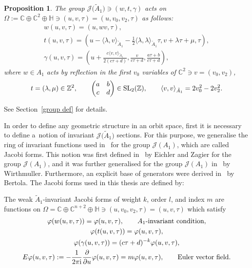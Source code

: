 \documentclass[pdftex]{sigma}%
\numberwithin{equation}{section}
\newtheorem{Proposition}[Theorem]{Proposition}
 { \theoremstyle{definition}
\newtheorem{Definition}[Theorem]{Definition}
\newtheorem{Remark}[Theorem]{Remark} }
\newcommand{\Ja}{\mathcal{J}}
\begin{document}
 \begin{Proposition}
The group $\Ja\big(\tilde A_1\big)\ni (w,t,\gamma)$ acts on $\Omega:=\mathbb{C}\oplus \mathbb{C}^{2}\oplus \mathbb{H} \ni (u,v,\tau)=(u,v_0,v_2,\tau)$ as follows:
\begin{gather*}
w(u,v,\tau)=(u,wv,\tau),
\\
t(u,v,\tau)=\left(u- \langle \lambda,v \rangle_{\tilde A_1}-\frac{1}{2} \langle \lambda,\lambda \rangle_{\tilde A_1}\tau,v+\lambda\tau+\mu,\tau\right),
\\
\gamma(u,v,\tau)=\left(u+\frac{c \langle v,v \rangle_{\tilde A_1}}{2(c\tau+d)},\frac{v}{c\tau+d},\frac{a\tau+b}{c\tau+d}\right),
\end{gather*}
where $w \in A_1$ acts by reflection in the first $v_0$ variables of $ \mathbb{C}^{2} \ni v=(v_0,v_2)$,
\[
t=(\lambda,\mu) \in \mathbb{Z}^{2}, \qquad
\begin{pmatrix} a & b\\c & d\end{pmatrix} \in {\rm SL}_2(\mathbb{Z}),\qquad
\langle v,v \rangle_{\tilde A_1}=2v_0^2-2v_2^2.
\]
\end{Proposition}
See Section~\ref{group def} for details.

In order to define any geometric structure in an orbit space, first it is necessary to define a~notion of invariant $\Ja\big(\tilde A_1\big)$ sections. For this purpose, we generalise the ring of invariant functions used in~\cite{BertolaM.1, BertolaM.2} for the group $\Ja( A_1)$, which are called Jacobi forms. This notion was first defined in~\cite{M.EichlerandD.Zagier} by Eichler and Zagier for the group $\Ja(A_1)$, and it was further generalised for the group $\Ja( A_1)$ in~\cite{K.Wirthmuller} by Wirthmuller. Furthermore, an explicit base of generators were derived in~\cite{BertolaM.1, BertolaM.2} by Bertola. The Jacobi forms used in this thesis are defined by:

\begin{Definition}
The weak $\tilde A_1$-invariant Jacobi forms of weight $k$, order $l$, and index $m$ are functions on $\Omega=\mathbb{C}\oplus \mathbb{C}^{n+2}\oplus\mathbb{H}\ni (u,v_0,v_2,\tau)=(u,v,\tau)$ which satisfy
\begin{gather}
\varphi(w(u,v,\tau))=\varphi(u,v,\tau),\qquad \textrm{$A_1$-invariant condition},\nonumber
\\
\varphi(t(u,v,\tau))=\varphi(u,v,\tau),\nonumber
\\
\varphi(\gamma(u,v,\tau))=(c\tau+d)^{-k}\varphi(u,v,\tau),\nonumber
\\
E\varphi(u,v,\tau):=-\frac{1}{2\pi {\rm i}}\frac{\partial}{\partial u}\varphi(u,v,\tau)=m\varphi(u,v,\tau),\qquad \textrm{Euler vector field}.
\label{jacobiform in the introduction}
\end{gather}
\end{Definition}
\end{document}
